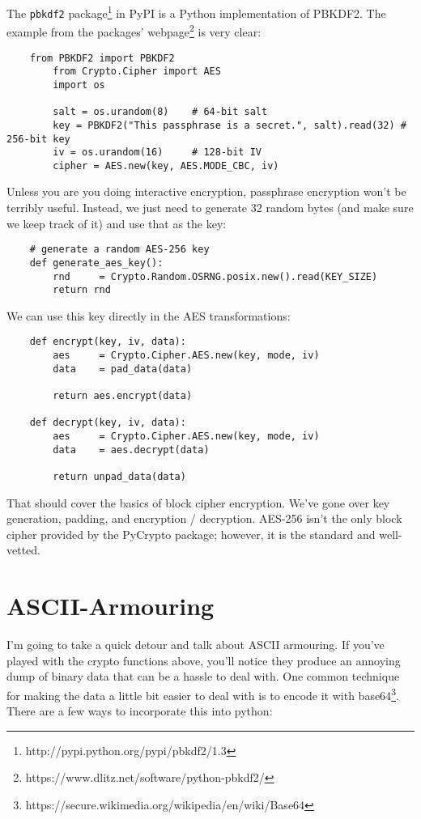 \documentclass[letterpaper,10pt]{article}
\begin{document}
The \verb|pbkdf2| package\footnote{http://pypi.python.org/pypi/pbkdf2/1.3}
in PyPI is a Python implementation of PBKDF2. The example from the packages'
webpage\footnote{https://www.dlitz.net/software/python-pbkdf2/}
is very clear:

\begin{verbatim}
    from PBKDF2 import PBKDF2
        from Crypto.Cipher import AES
        import os
    
        salt = os.urandom(8)    # 64-bit salt
        key = PBKDF2("This passphrase is a secret.", salt).read(32) # 256-bit key
        iv = os.urandom(16)     # 128-bit IV
        cipher = AES.new(key, AES.MODE_CBC, iv)
\end{verbatim}

Unless you are you doing interactive encryption, passphrase encryption won't be
terribly useful. Instead, we just need to generate 32 random bytes (and make
sure we keep track of it) and use that as the key:
\begin{verbatim}
    # generate a random AES-256 key
    def generate_aes_key():
        rnd     = Crypto.Random.OSRNG.posix.new().read(KEY_SIZE)
        return rnd
\end{verbatim}
We can use this key directly in the AES transformations:
\begin{verbatim}
    def encrypt(key, iv, data):
        aes     = Crypto.Cipher.AES.new(key, mode, iv)
        data    = pad_data(data)

        return aes.encrypt(data)

    def decrypt(key, iv, data):
        aes     = Crypto.Cipher.AES.new(key, mode, iv)
        data    = aes.decrypt(data)

        return unpad_data(data)
\end{verbatim}
That should cover the basics of block cipher encryption. We've gone over key
generation, padding, and encryption / decryption. AES-256 isn't the only 
block cipher provided by the PyCrypto package; however, it is the standard
and well-vetted. 

\section{ASCII-Armouring}
I'm going to take a quick detour and talk about ASCII armouring. If you've 
played with the crypto functions above, you'll notice they produce an annoying
dump of binary data that can be a hassle to deal with. One common technique for
making the data a little bit easier to deal with is to encode it with 
base64\footnote{https://secure.wikimedia.org/wikipedia/en/wiki/Base64}. There
are a few ways to incorporate this into python:
\end{document}

